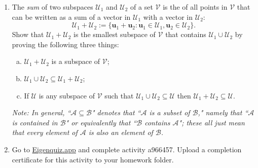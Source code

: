 \documentclass[12pt]{amsart}
\newcommand{\1}{\mathbbm{1}}
\numberwithin{equation}{section}
\numberwithin{Theorem}{section}
\theoremstyle{plain} %
\theoremstyle{definition}
\theoremstyle{remark}
\begin{document}
\begin{enumerate}[1.]
\item
The \textit{sum} of two subspaces $\mathcal{U}_1$ and $\mathcal{U}_2$ of a set $\mathcal{V}$ is the of all points in $\mathcal{V}$ that can be written as a sum of a vector in $\mathcal{U}_1$ with a vector in $\mathcal{U}_2$:
\begin{equation*}
\mathcal{U}_1+\mathcal{U}_2:=\{\mathbf{u}_1+\mathbf{u}_2: \mathbf{u}_1\in\mathcal{U}_1,\mathbf{u}_2\in\mathcal{U}_2\}.
\end{equation*}
Show that $\mathcal{U}_1+\mathcal{U}_2$ is the smallest subspace of $\mathcal{V}$ that contains $\mathcal{U}_1\cup\mathcal{U}_2$ by proving the following three things:
\begin{enumerate}[(a)]
\item
$\mathcal{U}_1+\mathcal{U}_2$ is a subspace of $\mathcal{V}$;
\item
$\mathcal{U}_1\cup\mathcal{U}_2\subseteq\mathcal{U}_1+\mathcal{U}_2$;
\item
If $\mathcal{U}$ is any subspace of $\mathcal{V}$ such that $\mathcal{U}_1\cup\mathcal{U}_2\subseteq\mathcal{U}$ then $\mathcal{U}_1+\mathcal{U}_2\subseteq\mathcal{U}$.
\end{enumerate}\bigskip

\textit{Note:
In general, ``$\mathcal{A}\subseteq\mathcal{B}$" denotes that ``$\mathcal{A}$ is a subset of $\mathcal{B}$," namely that ``$\mathcal{A}$ is contained in $\mathcal{B}$" or equivalently that ``$\mathcal{B}$ contains $\mathcal{A}$"; these all just mean that every element of $\mathcal{A}$ is also an element of $\mathcal{B}$.}\bigskip

\item Go to \href{https://eigenquiz.app/}{Eigenquiz.app} and complete activity a966457. Upload a completion certificate for this activity to your homework folder.
\end{enumerate}
\end{document}
